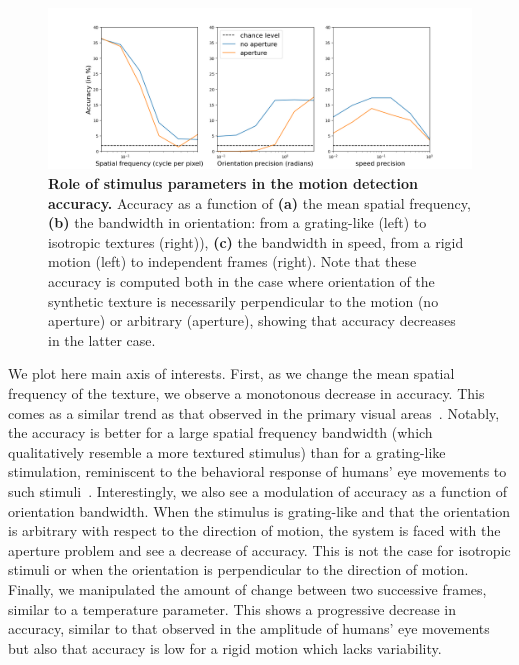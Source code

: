 \documentclass[default]{sn-jnl}%
\theoremstyle{thmstyleone}%
\theoremstyle{thmstyletwo}%
\theoremstyle{thmstylethree}%
\newcommand{\note}[1]{{\sethlcolor{yellow}\hl{#1}}}
\begin{document}
\begin{figure}%
    \centering
    \includegraphics[width=0.99\linewidth]{figures/2022-09-27_MotionDetection_motion_clouds.png}%
    \caption{{\bf Role of stimulus parameters in the motion detection accuracy.} Accuracy as a function of {\bf (a)} the mean spatial frequency, {\bf (b)} the bandwidth in orientation: from a grating-like (left) to isotropic textures (right)), {\bf (c)} the bandwidth in speed, from a rigid motion (left) to independent frames (right). Note that these accuracy is computed both in the case where orientation of the synthetic texture is necessarily perpendicular to the motion (no aperture) or arbitrary (aperture), showing that accuracy decreases in the latter case.}
    \label{fig:motion_clouds}
\end{figure}

We plot here main axis of interests. First, as we change the mean spatial frequency of the texture, we observe a monotonous decrease in accuracy. This comes as a similar trend as that observed in the primary visual areas~\citep{priebe_tuning_2006}. %
Notably, the accuracy is better for a large spatial frequency bandwidth (which qualitatively resemble a more textured stimulus) than for a grating-like stimulation, reminiscent to the behavioral response of humans' eye movements to such stimuli~\citep{simoncini_more_2012}. Interestingly, we also see a modulation of accuracy as a function of orientation bandwidth. When the stimulus is grating-like and that the orientation is arbitrary with respect to the direction of motion, the system is faced with the aperture problem and see a decrease of accuracy. This is not the case for isotropic stimuli or when the orientation is perpendicular to the direction of motion. Finally, we manipulated the amount of change between two successive frames, similar to a temperature parameter. This shows a progressive decrease in accuracy, similar to that observed in the amplitude of humans' eye movements~\citep{mansour_pour_speed_2018} but also that accuracy is low for a rigid motion which lacks variability.
%
\end{document}
